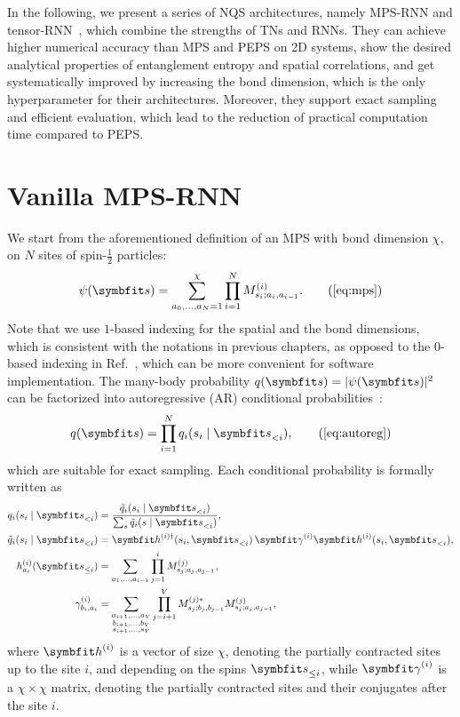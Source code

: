 In the following, we present a series of NQS architectures, namely MPS-RNN and tensor-RNN~\cite{wu2023tensor}, which combine the strengths of TNs and RNNs. They can achieve higher numerical accuracy than MPS and PEPS on 2D systems, show the desired analytical properties of entanglement entropy and spatial correlations, and get systematically improved by increasing the bond dimension, which is the only hyperparameter for their architectures. Moreover, they support exact sampling and efficient evaluation, which lead to the reduction of practical computation time compared to PEPS.

\section{Vanilla MPS-RNN}

We start from the aforementioned definition of an MPS with bond dimension $\chi$, on $N$ sites of spin-$\frac{1}{2}$ particles:
\begin{equation}
\psi(\vs) = \sum_{a_0, \ldots, a_N = 1}^\chi \prod_{i = 1}^N M^{(i)}_{s_i; a_i, a_{i - 1}}.
\tag{\ref{eq:mps}}
\end{equation}
Note that we use $1$-based indexing for the spatial and the bond dimensions, which is consistent with the notations in previous chapters, as opposed to the $0$-based indexing in Ref.~\cite{wu2023tensor}, which can be more convenient for software implementation. The many-body probability $q(\vs) = |\psi(\vs)|^2$ can be factorized into autoregressive (AR) conditional probabilities~\cite{ferris2012perfect, han2018unsupervised, wei2022sequential}:
\begin{equation}
q(\vs) = \prod_{i = 1}^N q_i(s_i \mid \vs_{< i}),
\tag{\ref{eq:autoreg}}
\end{equation}
which are suitable for exact sampling. Each conditional probability is formally written as
\begin{align}
q_i(s_i \mid \vs_{< i}) &=
\frac{\tilde{q}_i(s_i \mid \vs_{< i})}{\sum_s \tilde{q}_i(s \mid \vs_{< i})}, \\
\tilde{q}_i(s_i \mid \vs_{< i}) &=
\vh^{(i) \dagger}(s_i, \vs_{< i})\,\mga^{(i)} \vh^{(i)}(s_i, \vs_{< i}), \label{eq:mps-cond-prob} \\
h^{(i)}_{a_i}(\vs_{\le i}) &=
\sum_{a_1, \ldots, a_{i - 1}}
\prod_{j = 1}^i M^{(j)}_{s_j; a_j, a_{j - 1}}, \\
\gamma^{(i)}_{b_i, a_i} &=
\sum_{\substack{a_{i + 1}, \ldots, a_V \\ b_{i + 1}, \ldots, b_V \\ s_{i + 1}, \ldots, s_V}}
\prod_{j = i + 1}^V M^{(j) *}_{s_j; b_j, b_{j - 1}} M^{(j)}_{s_j; a_j, a_{j - 1}}, \label{eq:mps-gamma}
\end{align}
where $\vh^{(i)}$ is a vector of size $\chi$, denoting the partially contracted sites up to the site $i$, and depending on the spins $\vs_{\le i}$, while $\mga^{(i)}$ is a $\chi \times \chi$ matrix, denoting the partially contracted sites and their conjugates after the site $i$.

